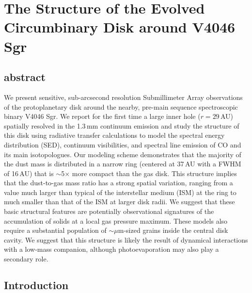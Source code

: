 
\chapter{The Structure of the Evolved Circumbinary Disk around V4046 Sgr}{\label{c:v4046_structure}

\section*{abstract}
We present sensitive, sub-arcsecond resolution Submillimeter Array observations 
of the protoplanetary disk around the nearby, pre-main sequence spectroscopic 
binary V4046 Sgr.  We report for the first time a large inner hole ($r=29$\,AU) 
spatially resolved in the 1.3\,mm continuum emission and study the structure of 
this disk using radiative transfer calculations to model the spectral energy
distribution (SED), continuum visibilities, and spectral line emission of CO and
its main isotopologues.  Our modeling scheme demonstrates that the majority of 
the dust mass is distributed in a narrow ring (centered at 37\,AU with a FWHM of
16\,AU) that is $\sim$5$\times$ more compact than the gas disk.  This structure 
implies that the dust-to-gas mass ratio has a strong spatial variation, ranging 
from a value much larger than typical of the interstellar medium (ISM) at the 
ring to much smaller than that of the ISM at larger disk radii.  We suggest that
these basic structural features are potentially observational signatures of the 
accumulation of solids at a local gas pressure maximum.  These models also 
require a substantial population of $\sim$$\mu$m-sized grains inside the central
disk cavity.  We suggest that this structure is likely the result of dynamical 
interactions with a low-mass companion, although photoevaporation may also play 
a secondary role.


\section{Introduction} \label{sec:intro}

}
